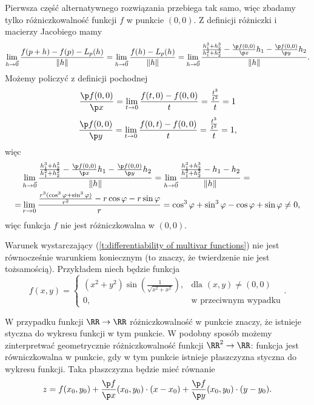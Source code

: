 \begin{solution}
    Pierwsza część alternatywnego rozwiązania przebiega tak samo, więc zbadamy tylko różniczkowalność funkcji $f$ w punkcie $(0, 0)$. Z definicji różniczki i macierzy Jacobiego mamy
    \[ \lim_{h\to\vec{0}} \frac{f(p + h) - f(p) - L_{p}(h)}{\Vert h \Vert} = \lim_{h\to\vec{0}} \frac{f(h) - L_{p}(h)}{\Vert h \Vert} = \lim_{h\to\vec{0}} \frac{\frac{h_1^3 + h_2^3}{h_1^2 + h_2^2} - \frac{\p f(0, 0)}{\p x}h_1 - \frac{\p f(0, 0)}{\p y}h_2}{\Vert h \Vert}. \]
    Możemy policzyć z definicji pochodnej
    \[ \frac{\p f(0, 0)}{\p x} = \lim_{t\to 0}\frac{f(t, 0) - f(0, 0)}{t} = \frac{\frac{t^3}{t^2}}{t} = 1 \]
    \[ \frac{\p f(0, 0)}{\p y} = \lim_{t\to 0}\frac{f(0, t) - f(0, 0)}{t} = \frac{\frac{t^3}{t^2}}{t} = 1, \]
    więc
    \begin{align*}
        &\lim_{h\to\vec{0}} \frac{\frac{h_1^3 + h_2^3}{h_1^2 + h_2^2} - \frac{\p f(0, 0)}{\p x}h_1 - \frac{\p f(0, 0)}{\p y}h_2}{\Vert h \Vert} = \lim_{h\to\vec{0}} \frac{\frac{h_1^3 + h_2^3}{h_1^2 + h_2^2} - h_1 - h_2}{\Vert h \Vert} = \\
        =& \lim_{r\to 0}\frac{\frac{r^3(\cos^3\varphi + \sin^3\varphi)}{r^2} - r\cos\varphi - r\sin\varphi}{r} = \cos^3\varphi + \sin^3\varphi - \cos\varphi + \sin\varphi \neq 0,
    \end{align*}
    więc funkcja $f$ nie jest różniczkowalna w $(0, 0)$.
\end{solution}

\begin{remark}
    Warunek wystarczający (\ref{t:differentiability of multivar functions}) nie jest równocześnie warunkiem koniecznym (to znaczy, że twierdzenie nie jest tożsamością). Przykładem niech będzie funkcja
    \[ f(x, y) = \begin{cases}(x^2 + y^2)\sin\left(\frac{1}{\sqrt{x^2 + x^2}}\right), & \text{dla } (x, y) \neq (0, 0) \\ 0, & \text{w przeciwnym wypadku}\end{cases}. \]
\end{remark}

W przypadku funkcji $\RR \to \RR$ różniczkowalność w punkcie znaczy, że istnieje styczna do wykresu funkcji w tym punkcie. W podobny sposób możemy zinterpretwać geometrycznie różniczkowalność funkcji $\RR^2 \to \RR$: funkcja jest równiczkowalna w punkcie, gdy w tym punkcie istnieje płaszczyzna styczna do wykresu funkcji. Taka płaszczyzna będzie mieć równanie
\begin{equation}
    z = f(x_0, y_0) + \frac{\p f}{\p x}(x_0, y_0) \cdot (x - x_0) + \frac{\p f}{\p y}(x_0, y_0) \cdot (y -y_0).
\end{equation}

